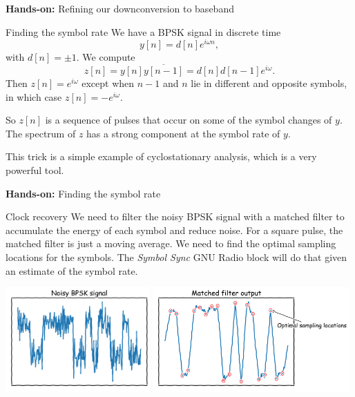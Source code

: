 \documentclass[aspectratio=169]{beamer}
\newcommand{\handson}[1]{\begin{frame}
 \begin{block}{}
   \begin{center}
     \vspace{0.5em}
     {\bf Hands-on:} #1
     \vspace{0.5em}
   \end{center}
 \end{block}
 \end{frame}
}
\begin{document}
\handson{Refining our downconversion to baseband}

\begin{frame}{Finding the symbol rate}
  We have a BPSK signal in discrete time
  \[
  y[n] = d[n] e^{i \omega n},
  \]
  with $d[n] = \pm 1$. We compute
  \[
  z[n] = y[n] \overline{y[n-1]} = d[n]d[n-1] e^{i \omega}.
  \]
  Then $z[n] = e^{i\omega}$ except when $n-1$ and $n$ lie in different and
  opposite symbols, in which case $z[n] = -e^{i\omega}$.

  \medskip

  So $z[n]$ is a sequence of pulses that occur on some of the symbol changes of
  $y$. The spectrum of $z$ has a strong component at the symbol rate of $y$.

  \medskip
  
  This trick is a simple example of cyclostationary analysis, which is a very
  powerful tool.
\end{frame}

\handson{Finding the symbol rate}

\begin{frame}{Clock recovery}
  We need to filter the noisy BPSK signal with a matched filter to accumulate
  the energy of each symbol and reduce noise. For a square pulse, the matched
  filter is just a moving average. We need to find the optimal sampling
  locations for the symbols. The \emph{Symbol Sync} GNU Radio block will do that
  given an estimate of the symbol rate.

  \begin{center}
    \includegraphics[height=4cm]{pre_matched}
    \includegraphics[height=4cm]{post_matched}
  \end{center}
\end{frame}
\end{document}
